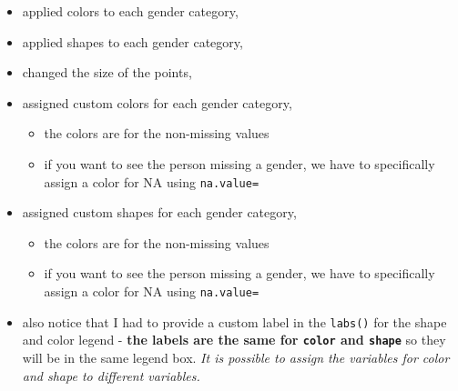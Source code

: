 \documentclass[
  letterpaper,
  DIV=11,
  numbers=noendperiod]{scrartcl}
\providecommand{\tightlist}{%
  \setlength{\itemsep}{0pt}\setlength{\parskip}{0pt}}\usepackage{longtable,booktabs,array}
\begin{document}
\begin{itemize}
\tightlist
\item
  applied colors to each gender category,
\item
  applied shapes to each gender category,
\item
  changed the size of the points,
\item
  assigned custom colors for each gender category,

  \begin{itemize}
  \tightlist
  \item
    the colors are for the non-missing values
  \item
    if you want to see the person missing a gender, we have to
    specifically assign a color for NA using \texttt{na.value=}
  \end{itemize}
\item
  assigned custom shapes for each gender category,

  \begin{itemize}
  \tightlist
  \item
    the colors are for the non-missing values
  \item
    if you want to see the person missing a gender, we have to
    specifically assign a color for NA using \texttt{na.value=}
  \end{itemize}
\item
  also notice that I had to provide a custom label in the
  \texttt{labs()} for the shape and color legend - \textbf{the labels
  are the same for \texttt{color} and \texttt{shape}} so they will be in
  the same legend box. \emph{It is possible to assign the variables for
  color and shape to different variables.}
\end{itemize}
\end{document}
